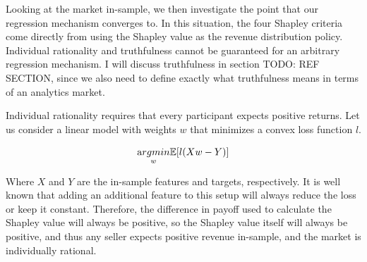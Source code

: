 Looking at the market in-sample, we then investigate the point that our
regression mechanism converges to. In this situation, the four Shapley criteria
come directly from using the Shapley value as the revenue distribution policy.
Individual rationality and truthfulness cannot be guaranteed for an arbitrary
regression mechanism. I will discuss truthfulness in section TODO: REF SECTION,
since we also need to define exactly what truthfulness means in terms of an
analytics market.

Individual rationality requires that every participant expects positive
returns. Let us consider a linear model with weights $w$ that minimizes a
convex loss function $l$.

\begin{equation}
  \underset{w}{\text argmin} \mathbb E \lbrack l(X w - Y) \rbrack 
\end{equation}

Where $X$ and $Y$ are the in-sample features and targets, respectively. It is
well known that adding an additional feature to this setup will always reduce
the loss or keep it constant. Therefore, the difference in payoff used to
calculate the Shapley value will always be positive, so the Shapley value
itself will always be positive, and thus any seller expects positive revenue
in-sample, and the market is individually rational.




